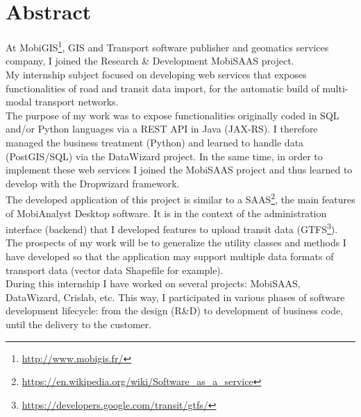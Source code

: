 \chapter*{Abstract}

At MobiGIS\footnote{\url{http://www.mobigis.fr/}}, GIS and Transport software publisher and geomatics services company, I joined the Research \& Development \og MobiSAAS \fg project.\\

My internship subject focused on developing web services that exposes functionalities of road and transit data import, for the automatic build of multi-modal transport networks.\\

The purpose of my work was to expose functionalities originally coded in SQL and/or Python languages via a REST API in Java (JAX-RS). I therefore managed the business treatment (Python) and learned to handle data (PostGIS/SQL) via the \og DataWizard \fg project. In the same time, in order to implement these web services I joined the \og MobiSAAS \fg project and thus learned to develop with the \og Dropwizard \fg framework.\\

The developed application of this project is similar to a SAAS\footnote{\url{https://en.wikipedia.org/wiki/Software_as_a_service}}, the main features of MobiAnalyst Desktop software. It is in the context of the administration interface (backend) that I developed features to upload transit data (GTFS\footnote{\url{https://developers.google.com/transit/gtfs/}}). The prospects of my work will be to generalize the utility classes and methods I have developed so that the application may support multiple data formats of transport data (vector data \og Shapefile \fg for example).\\

During this internship I have worked on several projects: MobiSAAS, DataWizard, Crislab, etc. This way, I participated in various phases of software development lifecycle: from the design (R\&D) to development of business code, until the delivery to the customer.
